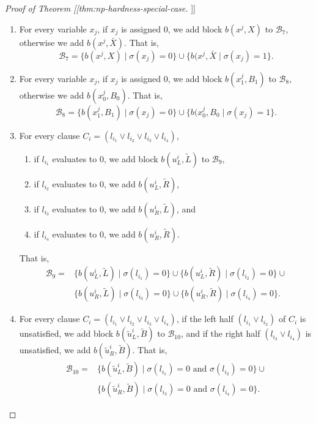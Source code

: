 \documentclass[fontsize=11pt,paper=a4]{book}
\begin{document}
\begin{proof}[Proof of Theorem [[thm:np-hardness-special-case]]]
\begin{enumerate}
\item For every variable \(x_j\), if \(x_j\) is assigned \(0\), we add block \(b(x^j,X)\) to \(\mathscr{B}_7\), otherwise we add \(b(x^j,\bar{X})\).
That is,
\[
   \mathscr{B}_7=\{b(x^j,X)\mid\sigma(x_j)=0\}\cup\{b(x^j,\bar{X}\mid\sigma(x_j)=1\}.
   \]

\item For every variable \(x_j\), if \(x_j\) is assigned \(0\), we add block \(b(x_1^j,B_1)\) to \(\mathscr{B}_8\), otherwise we add \(b(x_0^j,B_0)\).
That is,
\[
   \mathscr{B}_8=\{b(x_1^j,B_1)\mid\sigma(x_j)=0\}\cup\{b(x_0^j,B_0\mid\sigma(x_j)=1\}.
   \]

\item For every clause \(C_i=(l_{i_1}\vee l_{i_2}\vee l_{i_3}\vee l_{i_4})\),

\begin{enumerate}
\item if \(l_{i_1}\) evaluates to \(0\), we add block \(b(u_L^i,\tilde{L})\) to \(\mathscr{B}_9\),

\item if \(l_{i_2}\) evaluates to \(0\), we add \(b(u_L^i,\tilde{R})\),

\item if \(l_{i_3}\) evaluates to \(0\), we add \(b(u_R^i,\tilde{L})\), and

\item if \(l_{i_4}\) evaluates to \(0\), we add \(b(u_R^i,\tilde{R})\).
\end{enumerate}

That is,
\begin{align*}
\mathscr{B}_9=&\{b(u_L^i,\tilde{L})\mid\sigma(l_{i_1})=0\}\cup
\{b(u_L^i,\tilde{R})\mid\sigma(l_{i_2})=0\}\cup\\
&\{b(u_R^i,\tilde{L})\mid\sigma(l_{i_3})=0\}\cup
\{b(u_R^i,\tilde{R})\mid\sigma(l_{i_4})=0\}.
\end{align*}

\item For every clause \(C_i=(l_{i_1}\vee l_{i_2}\vee l_{i_3}\vee l_{i_4})\), if the left half \((l_{i_1}\vee l_{i_2})\) of \(C_i\) is unsatisfied, we add block \(b(\tilde{u}_L^i,\tilde{B})\) to \(\mathscr{B}_{10}\), and if the right half \((l_{i_3}\vee l_{i_4})\) is unsatisfied, we add \(b(\tilde{u}_R^i,\tilde{B})\).
That is,
\begin{align*}
\mathscr{B}_{10}=&\{b(\tilde{u}_L^i,\tilde{B})\mid\sigma(l_{i_1})=0\text{ and }\sigma(l_{i_2})=0\}\cup\\
&\{b(\tilde{u}_R^i,\tilde{B})\mid\sigma(l_{i_3})=0\text{ and }\sigma(l_{i_4})=0\}.
\end{align*}


\end{enumerate}
\end{proof}
\end{document}
